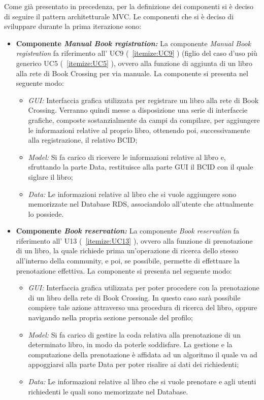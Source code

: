 Come già presentato in precedenza, per la definizione dei componenti si è deciso di seguire il pattern architetturale MVC. 
Le componenti che si è deciso di sviluppare durante la prima iterazione sono: 
\begin{itemize}
	\item \textbf{Componente \textit{Manual Book registration:}} La componente \textit{Manual Book registration} fa riferimento all’ UC9 (~\ref{itemize:UC9} ) (figlio del caso d'uso più generico UC5 (~\ref{itemize:UC5} ), ovvero alla funzione di aggiunta di un libro alla rete di Book Crossing per via manuale. La componente si presenta nel seguente modo:
	\begin{itemize}
		\item \textit{GUI:} Interfaccia grafica utilizzata per registrare un libro alla rete di Book Crossing. Verranno quindi messe a disposizione una serie di interfaccie grafiche, composte sostanzialmente da campi da compilare, per aggiungere le informazioni relative al proprio libro, ottenendo poi, successivamente alla registrazione, il relativo BCID;
		\item \textit{Model:} Si fa carico di ricevere le informazioni relative al libro e, sfruttando la parte Data, restituisce alla parte GUI il BCID con il quale siglare il libro;
		\item \textit{Data:} Le informazioni relative al libro che si vuole aggiungere sono memorizzate nel Database RDS, associandolo all'utente che attualmente lo possiede. 
	\end{itemize}
	\item \textbf{Componente \textit{Book reservation:}}  La componente \textit{Book reservation} fa riferimento all’ U13 (~\ref{itemize:UC13} ), ovvero alla funzione di prenotazione di un libro, la quale richiede prima un'operazione di ricerca dello stesso all'interno della community, e poi, se possibile, permette di effettuare la prenotazione  effettiva. La componente si presenta nel seguente modo:
	\begin{itemize}
		\item \textit{GUI:} Interfaccia grafica utilizzata per poter procedere con la prenotazione di un libro della rete di Book Crossing. In questo caso sarà possibile compiere tale azione attraverso una procedura di ricerca del libro, oppure navigando nella propria sezione personale del profilo;
		\item \textit{Model:} Si fa carico di gestire la coda relativa alla prenotazione di un determinato libro, in modo da poterle soddisfare. La gestione e la computazione della prenotazione è affidata ad un algoritmo il quale va ad appoggiarsi alla parte Data per poter risalire ai dati dei richiedenti;
		\item \textit{Data:} Le informazioni relative al libro che si vuole prenotare e agli utenti richiedenti le quali sono memorizzate nel Database.
	\end{itemize}
\end{itemize}